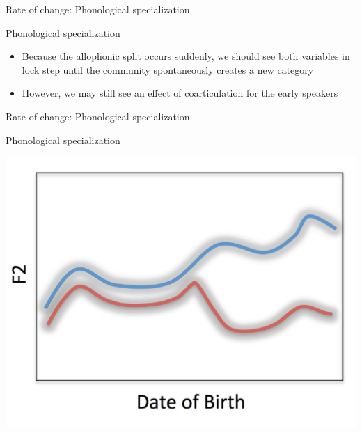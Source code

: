 \documentclass[hyperref={pdfpagelabels=false}]{beamer}
\begin{document}
\begin{frame}{Rate of change: Phonological specialization}
	\begin{block}{Phonological specialization}
		\begin{itemize}
			\item Because the allophonic split occurs suddenly, we should see both variables in lock step until the community spontaneously creates a new category \pause
			\item However, we may still see an effect of coarticulation for the early speakers
		\end{itemize}
	\end{block}
\end{frame}

\begin{frame}{Rate of change: Phonological specialization}
	\begin{block}{Phonological specialization}
		\begin{center}
		\includegraphics[trim=2cm 2cm 2cm 2cm, clip=false, width=.6\textwidth]{phonspROC.pdf}
		\end{center}
	\end{block}	
\end{frame}
\end{document}
